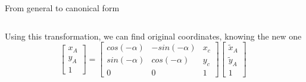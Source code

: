 \documentclass[aspectratio=169]{beamer}
\begin{document}
\begin{frame}[t]{From general to canonical form}
\begin{columns}[onlytextwidth]
Using this transformation, we can find original coordinates, knowing the new one
\begin{equation*} \begin{bmatrix}
x_A\\ y_A \\1
\end{bmatrix} = 
\begin{bmatrix}
cos(-\alpha) & -sin(-\alpha) & x_c \\ sin(-\alpha) & cos(-\alpha) & y_c \\ 0 & 0 & 1
\end{bmatrix} \begin{bmatrix}
\tilde{x}_A\\\tilde{y}_A\\1
\end{bmatrix}
\end{equation*}
\end{columns}
\end{frame}
\end{document}
